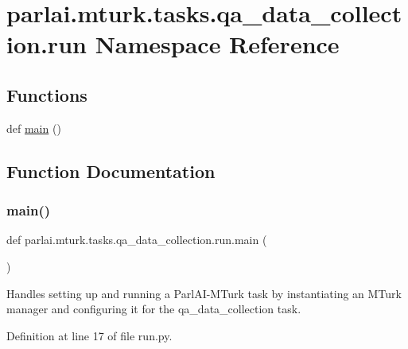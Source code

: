 \hypertarget{namespaceparlai_1_1mturk_1_1tasks_1_1qa__data__collection_1_1run}{}\section{parlai.\+mturk.\+tasks.\+qa\+\_\+data\+\_\+collection.\+run Namespace Reference}
\label{namespaceparlai_1_1mturk_1_1tasks_1_1qa__data__collection_1_1run}
\subsection*{Functions}
\begin{DoxyCompactItemize}
\item 
def \hyperlink{namespaceparlai_1_1mturk_1_1tasks_1_1qa__data__collection_1_1run_a461bad0b4f8f16a8ea54e7231ad8848b}{main} ()
\end{DoxyCompactItemize}


\subsection{Function Documentation}
\mbox{\label{namespaceparlai_1_1mturk_1_1tasks_1_1qa__data__collection_1_1run_a461bad0b4f8f16a8ea54e7231ad8848b}} 
\subsubsection{\texorpdfstring{main()}{main()}}
{\footnotesize\ttfamily def parlai.\+mturk.\+tasks.\+qa\+\_\+data\+\_\+collection.\+run.\+main (\begin{DoxyParamCaption}{ }\end{DoxyParamCaption})}

\begin{DoxyVerb}Handles setting up and running a ParlAI-MTurk task by instantiating an MTurk manager
and configuring it for the qa_data_collection task.
\end{DoxyVerb}
 

Definition at line 17 of file run.\+py.



